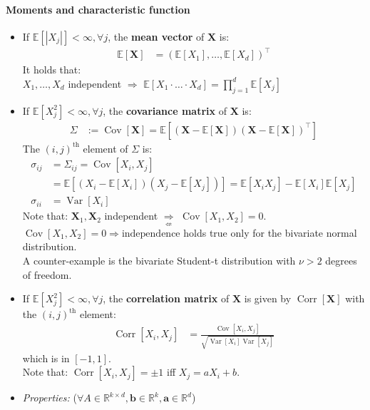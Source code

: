 \documentclass[a4paper,landscape,8pt,fleqn]{scrartcl}
\renewcommand{\emph}[1]{\textbf{#1}}
\DeclareMathOperator{\Var}{Var}				%
\DeclareMathOperator{\Cov}{Cov}				%
\DeclareMathOperator{\Corr}{Corr}				%
\begin{document}
\begin{multicols*}{3}
\paragraph{Moments and characteristic function}
\begin{itemize}
\item If $\mathbb{E}[|X_j|] < \infty, \forall j$, the \emph{mean vector} of $\bm X$ is:
\begin{align*}
\mathbb{E}[\bm X] &= (\mathbb{E}[X_1], \ldots, \mathbb{E}[X_d])^\top
\end{align*}
It holds that: \\
$X_1, \ldots, X_d$ independent $\Rightarrow$ $\mathbb{E}[X_1 \cdot \ldots \cdot X_d] = \prod_{j=1}^d \mathbb{E}[X_j]$
\item If $\mathbb{E}[X_j^2] < \infty, \forall j$, the \emph{covariance matrix} of $\bm X$ is:
\begin{align*}
\Sigma &:= \Cov[\bm X] = \mathbb{E} \left[ (\bm X - \mathbb{E}[\bm X]) (\bm X - \mathbb{E}[\bm X])^\top \right]
\end{align*}
The $(i,j)^\text{th}$ element of $\Sigma$ is:
\begin{align*}
\sigma_{ij} &= \Sigma_{ij} = \Cov[X_i, X_j] \\
&= \mathbb{E}[(X_i - \mathbb{E}[X_i]) (X_j - \mathbb{E}[X_j])] = \mathbb{E}[X_i X_j] - \mathbb{E}[X_i] \mathbb{E}[X_j] \\
\sigma_{ii} &= \Var[X_i]
\end{align*}
Note that: $\bm X_1, \bm X_2$ independent $\underset{\not\Leftarrow}{\Rightarrow}$ $\Cov[X_1, X_2] = 0$. \\
$\Cov[X_1, X_2] = 0 \Rightarrow \text{independence}$ holds true only for the bivariate normal distribution. \\
A counter-example is the bivariate Student-t distribution with $\nu > 2$ degrees of freedom.
\item If $\mathbb{E}[X_j^2] < \infty, \forall j$, the \emph{correlation matrix} of $\bm X$ is given by $\Corr[\bm X]$ with the $(i,j)^\text{th}$ element:
\begin{align*}
\Corr[X_i, X_j] &= \frac{\Cov[X_i, X_j]}{\sqrt{\Var[X_i] \Var[X_j]}}
\end{align*}
which is in $[-1,1]$. \\
Note that: $\Corr[X_i, X_j] = \pm 1$ iff $X_j = a X_i + b$.
\item \textit{Properties:} ($\forall A \in \mathbb{R}^{k \times d}, \bm b \in \mathbb{R}^k, \bm a \in \mathbb{R}^d$)
\begin{itemize}

\end{itemize}
\end{itemize}
\end{multicols*}
\end{document}
